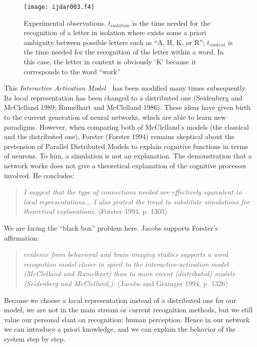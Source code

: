 \documentclass[ijdar]{svjour}
\begin{document}
\begin{figure}%
\texttt{[image: ijdar003.f4]}%
\caption{Experimental observations. $t_{isolation}$ is the time needed
for the recognition of a letter in isolation where exists some a priori
ambiguity between possible letters such as ``A, H, K, or R'';
$t_{context}$ is the time needed for the recognition of the letter
within a word. In this case, the letter in context is obviously `K'
because it corresponds to the word ``work''}
\label{FIGWSE}
\end{figure}


This {\it Interactive Activation Model}~~has been modified many times subsequently.
Its local represen\-tation has been changed to a distributed one (Seidenberg and McClelland 1989; Rumelhart and McClelland 1986).
These ideas have given birth to the current generation of neural networks, which are able to learn new paradigms.
However, when comparing both of McClelland's models (the classical and the distributed one), Forster (Forster 1994) remains skeptical about the pretension of Parallel Distributed Models to explain cognitive functions in terms of neurons.
To him, a simulation is not an explanation.
The demonstration that a network works does not give a theoretical explanation of the cognitive processes involved.
He concludes:

\medskip

\begin{quote}
{\it I suggest that the type of connections needed are effectively equivalent to local representations... I also protest the trend to substitute simulations for theoretical
explanations}. (Forster 1994, p. 1303)
\end{quote}

\medskip \noindent
We are facing the ``black box'' problem here.
Jacobs supports Forster's affirmation:

\medskip

\begin{quote}
{\it evidence from behavioral and brain imaging studies supports a word recognition model closer in spirit to the interactive-activation model (McClelland and Rumelhart) than to more recent (distributed) models (Seidenberg and
McClelland,).} (Jacobs and Grainger 1994, p. 1326)
\end{quote}

\medskip \noindent
Because we choose a local representation instead of a distributed one for our model, we are not in the main stream or current recognition methods, but we still value our personal slant on recognition:  human perception.
Hence in our network we can introduce {a priori} knowledge, and we can explain the behavior of the system step by step.
\end{document}
